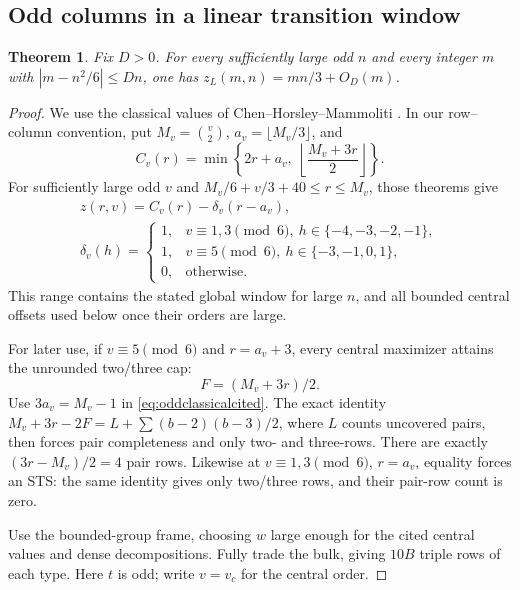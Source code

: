\documentclass[11pt]{article}
\newtheorem{theorem}{Theorem}
\newcommand{\zl}{z_L}
\begin{document}
\subsection{Odd columns in a linear transition window}\label{sec:oddtransition}
\begin{theorem}\label{thm:oddtransition}
Fix $D>0$. For every sufficiently large odd $n$ and every integer $m$
with $|m-n^2/6|\le Dn$, one has $\zl(m,n)=mn/3+O_D(m)$.
\end{theorem}
\begin{proof}
We use the classical values of Chen--Horsley--Mammoliti
\cite[Theorems 1.1--1.2]{chm-triple}. In our row--column convention,
put $M_v=\binom v2$, $a_v=\lfloor M_v/3\rfloor$, and
\[
 C_v(r)=\min\left\{2r+a_v,\;
                    \left\lfloor\frac{M_v+3r}{2}\right\rfloor\right\}.
\]
For sufficiently large odd $v$ and
$M_v/6+v/3+40\le r\le M_v$, those theorems give
\begin{equation}\label{eq:oddclassicalcited}
 \begin{gathered}
 z(r,v)=C_v(r)-\delta_v(r-a_v),\\
 \delta_v(h)=
 \begin{cases}
 1,&v\equiv1,3\pmod6,\ h\in\{-4,-3,-2,-1\},\\
 1,&v\equiv5\pmod6,\ h\in\{-3,-1,0,1\},\\
 0,&\text{otherwise}.
 \end{cases}
 \end{gathered}
\end{equation}
This range contains the stated global window for large $n$, and all
bounded central offsets used below once their orders are large.

For later use, if $v\equiv5\pmod6$ and $r=a_v+3$, every central
maximizer attains the unrounded two/three cap:
\begin{equation}\label{eq:oddcentralequality}
 F=(M_v+3r)/2.
\end{equation}
Use $3a_v=M_v-1$ in \eqref{eq:oddclassicalcited}. The exact identity
$M_v+3r-2F=L+\sum(b-2)(b-3)/2$, where $L$ counts uncovered pairs,
then forces pair completeness and only two- and three-rows. There are
exactly $(3r-M_v)/2=4$ pair rows. Likewise at $v\equiv1,3\pmod6$,
$r=a_v$, equality forces an STS: the same identity gives only two/three
rows, and their pair-row count is zero.

Use the bounded-group frame, choosing $w$ large enough for the cited
central values and dense decompositions.
Fully trade the bulk, giving $10B$ triple rows of each type.
Here $t$ is odd; write $v=v_c$ for the central order.


\end{proof}
\end{document}

